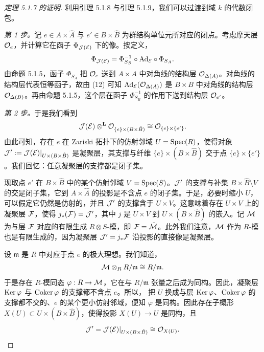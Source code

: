 \begin{proof}[定理 5.1.7 的证明]
利用引理 5.1.8 与引理 5.1.9，我们可以过渡到域 $k$ 的代数闭包。

\emph{第 1 步。}记 $e\in A\times\hat A$ 与 $e'\in B\times\hat B$ 为群结构单位元所对应的闭点。考虑摩天层 $\mathcal{O}_e$，并计算它在函子 $\Phi_{\mathcal{J}(\mathcal{E})}$ 下的像。按定义，
\begin{equation*}
\Phi_{\mathcal{J}(\mathcal{E})}=\Phi^{-1}_{S_B}\circ\mathrm{Ad}_{\mathcal{E}}\circ\Phi_{S_A}.
\end{equation*}
由命题 5.1.5，函子 $\Phi_{S_A}$ 把 $\mathcal{O}_e$ 送到 $A\times A$ 中对角线的结构层 $\mathcal{O}_{\Delta(A)}$。对角线的结构层代表恒等函子，故由 (12) 可知 $\mathrm{Ad}_{\mathcal{E}}(\mathcal{O}_{\Delta(A)})$ 是 $B\times B$ 中对角线的结构层 $\mathcal{O}_{\Delta(B)}$。再由命题 5.1.5，这个层在函子 $\Phi^{-1}_{S_B}$ 的作用下送到结构层 $\mathcal{O}_{e'}$。

\emph{第 2 步。}于是我们看到
\begin{equation*}
\mathcal{J}(\mathcal{E})\otimes^{\mathbf{L}}\mathcal{O}_{\{e\}\times(B\times\hat B)}\cong\mathcal{O}_{\{e\}\times\{e'\}}.
\end{equation*}
由此可知，存在 $e$ 在 Zariski 拓扑下的仿射邻域 $U=\operatorname{Spec}(R)$，使得对象 $\mathcal{J}':=\mathcal{J}(\mathcal{E})|_{U\times(B\times\hat B)}$ 是凝聚层，其支撑与纤维 $\{e\}\times(B\times\hat B)$ 交于点 $\{e\}\times\{e'\}$。我们回忆：任意凝聚层的支撑都是闭子集。

现取点 $e'$ 在 $B\times\hat B$ 中的某个仿射邻域 $V=\operatorname{Spec}(S)$。$\mathcal{J}'$ 的支撑与补集 $B\times\hat B\setminus V$ 的交是闭子集，它到 $A\times\hat A$ 的投影是不含点 $e$ 的闭子集。于是，必要时缩小 $U$，可以假定它仍然是仿射的，并且 $\mathcal{J}'$ 的支撑含于 $U\times V$。这意味着存在 $U\times V$ 上的凝聚层 $\mathcal{F}$，使得 $j_*(\mathcal{F})=\mathcal{J}'$，其中 $j$ 是 $U\times V$ 到 $U\times(B\times\hat B)$ 的嵌入。记 $\mathcal{M}$ 为与层 $\mathcal{F}$ 对应的有限生成 $R\otimes S$-模，即 $\mathcal{F}=\tilde{\mathcal{M}}$。此外我们注意，$\mathcal{M}$ 作为 $R$-模也是有限生成的，因为凝聚层 $\mathcal{J}'=j_*\mathcal{F}$ 沿投影的直接像是凝聚层。

设 $\mathfrak m$ 是 $R$ 中对应于点 $e$ 的极大理想。我们知道，
\begin{equation*}
\mathcal{M}\otimes_R R/\mathfrak m\cong R/\mathfrak m.
\end{equation*}
于是存在 $R$-模同态 $\varphi:R\to\mathcal{M}$，它在与 $R/\mathfrak m$ 张量之后成为同构。因此，凝聚层 $\operatorname{Ker}\varphi$ 与 $\operatorname{Coker}\varphi$ 的支撑都不含点 $e$。所以，
把 $U$ 换成与层 $\operatorname{Ker}\varphi$、$\operatorname{Coker}\varphi$ 的支撑都不交的、$e$ 的某个更小仿射邻域，便知 $\varphi$ 是同构。因此存在子概形 $X(U)\subset U\times(B\times\hat B)$，使得投影 $X(U)\to U$ 是同构，且
\begin{equation*}
\mathcal{J}'=\mathcal{J}(\mathcal{E})|_{U\times(B\times\hat B)}\cong\mathcal{O}_{X(U)}.
\end{equation*}


\end{proof}
